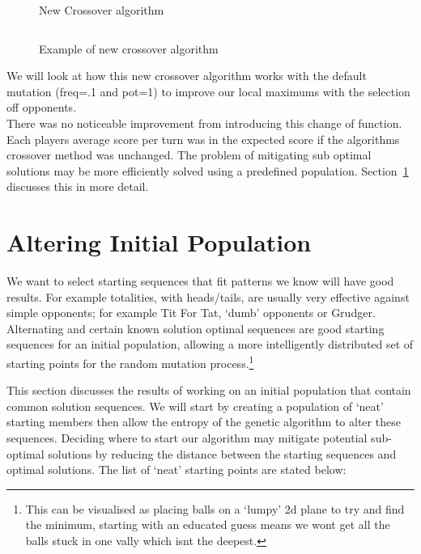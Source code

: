 \begin{figure}
    \inputminted{python}{code_snippets/newCrossover.py}
    \caption{New Crossover algorithm}\label{fig:newCrossover}
\end{figure}

\begin{figure}
    \inputminted{python}{code_snippets/newCrossoverEX.py}
    \caption{Example of new crossover algorithm}\label{fig:newCrossoverEX}
\end{figure}

We will look at how this new crossover algorithm works with the default mutation (freq=.1 and pot=1) to improve our local maximums with the selection off opponents.\\

There was no noticeable improvement from introducing this change of function.
Each players average score per turn was in the expected score if the algorithms crossover method was unchanged.
The problem of mitigating sub optimal solutions may be more efficiently solved using a predefined population.
Section~\ref{sec:alteringinitialpopulation} discusses this in more detail.

\section{Altering Initial Population}\label{sec:alteringinitialpopulation}
We want to select starting sequences that fit patterns we know will have good results.
For example totalities, with heads/tails, are usually very effective against simple opponents;
for example Tit For Tat, `dumb' opponents or Grudger.
Alternating and certain known solution optimal sequences are good starting sequences for an initial population, allowing a more intelligently distributed set of starting points for the random mutation process.\footnote{This can be visualised as placing balls on a `lumpy' 2d plane to try and find the minimum, starting with an educated guess means we wont get all the balls stuck in one vally which isnt the deepest.}

This section discusses the results of working on an initial population that contain common solution sequences.
We will start by creating a population of `neat' starting members then allow the entropy of the genetic algorithm to alter these sequences.
Deciding where to start our algorithm may mitigate potential sub-optimal solutions by reducing the distance between the starting sequences and optimal solutions.
The list of `neat' starting points are stated below:\\

